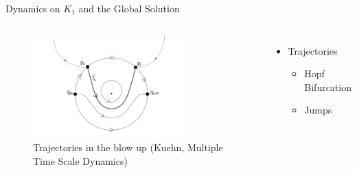 \documentclass[11pt]{beamer}
\begin{document}
\begin{frame}{Dynamics on $K_1$ and the Global Solution}
\begin{columns}
	\begin{figure}
		\centering
\includegraphics[height=4cm,width=6cm]{Images/pres-cancard}
		\caption{Trajectories in the blow up (Kuehn, Multiple Time Scale Dynamics)}
		
	\end{figure}
	\begin{itemize}
		\item Trajectories
		\begin{itemize}
			\item Hopf Bifurcation
			\item Jumps
		\end{itemize}
		
	\end{itemize}
\end{columns}
\end{frame}
\end{document}

